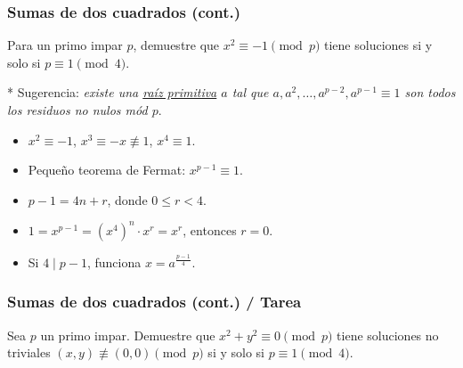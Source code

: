 \documentclass[handout]{beamer}
\begin{document}

\begin{frame}[fragile]
  \frametitle{Sumas de dos cuadrados (cont.)}

  \begin{shaded}
    Para un primo impar $p$, demuestre que $x^2 \equiv -1 \pmod{p}$ tiene
    soluciones si y solo si $p \equiv 1 \pmod{4}$.
  \end{shaded}

  * Sugerencia: \emph{existe una \underline{raíz primitiva} $a$ tal que
    $a, a^2, \ldots, a^{p-2}, a^{p-1} \equiv 1$ son todos los residuos no nulos mód
    $p$}.

  \vspace{\fill}
  
  \ifdefined\solutions

  \begin{itemize}
  \item<3-> $x^2 \equiv -1$, $x^3 \equiv -x \not\equiv 1$, $x^4 \equiv 1$.

  \item<4-> Pequeño teorema de Fermat: $x^{p-1} \equiv 1$.

  \item<5-> $p-1 = 4n + r$, donde $0 \le r < 4$.

  \item<6-> $1 = x^{p-1} = (x^4)^n\cdot x^r = x^r$, entonces $r = 0$.

  \item<7-> Si $4 \mid p-1$, funciona $x = a^{\frac{p-1}{4}}$.
  \end{itemize}
  \fi
\end{frame}


\begin{frame}[fragile]
  \frametitle{Sumas de dos cuadrados (cont.) / Tarea}

  \begin{shaded}
    Sea $p$ un primo impar. Demuestre que $x^2 + y^2 \equiv 0 \pmod{p}$ tiene
    soluciones no triviales $(x,y) \not\equiv (0,0) \pmod{p}$ si y solo si
    $p \equiv 1 \pmod{4}$.
  \end{shaded}

  \vspace{\fill}

  \iffalse
  \ifdefined\solutions
  \onslide<2->{\rule{2cm}{1pt}}

  \begin{itemize}
  \item<3-> Recordatorio: si $y \not\equiv 0$, entonces existe $y^{-1}$ tal que
    $y y^{-1} \equiv 1 \pmod{p}$.

  \item<4-> $x^2 + y^2 \equiv 0$, $y \not\equiv 0$ $\Longrightarrow$
    $(x\,y^{-1})^2 \equiv -1$.
  \end{itemize}
  \fi
  \fi
\end{frame}
\end{document}
